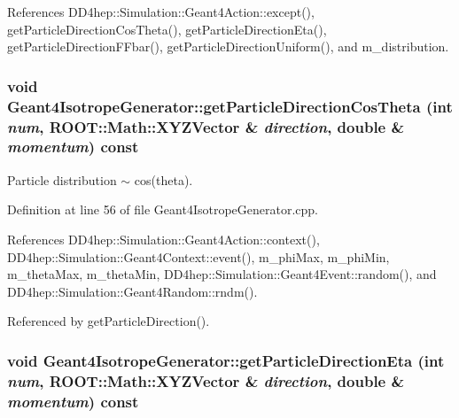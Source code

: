 References DD4hep::Simulation::Geant4Action::except(), getParticleDirectionCosTheta(), getParticleDirectionEta(), getParticleDirectionFFbar(), getParticleDirectionUniform(), and m\_\-distribution.\hypertarget{class_d_d4hep_1_1_simulation_1_1_geant4_isotrope_generator_a65335e157f828238e0e9f30fcd3dc0d8}{
\subsubsection[{getParticleDirectionCosTheta}]{\setlength{\rightskip}{0pt plus 5cm}void Geant4IsotropeGenerator::getParticleDirectionCosTheta (int {\em num}, \/  ROOT::Math::XYZVector \& {\em direction}, \/  double \& {\em momentum}) const}}
\label{class_d_d4hep_1_1_simulation_1_1_geant4_isotrope_generator_a65335e157f828238e0e9f30fcd3dc0d8}


Particle distribution $\sim$ cos(theta). 

Definition at line 56 of file Geant4IsotropeGenerator.cpp.

References DD4hep::Simulation::Geant4Action::context(), DD4hep::Simulation::Geant4Context::event(), m\_\-phiMax, m\_\-phiMin, m\_\-thetaMax, m\_\-thetaMin, DD4hep::Simulation::Geant4Event::random(), and DD4hep::Simulation::Geant4Random::rndm().

Referenced by getParticleDirection().\hypertarget{class_d_d4hep_1_1_simulation_1_1_geant4_isotrope_generator_aa93baab476bd121730d9a51a3fd02eac}{
\subsubsection[{getParticleDirectionEta}]{\setlength{\rightskip}{0pt plus 5cm}void Geant4IsotropeGenerator::getParticleDirectionEta (int {\em num}, \/  ROOT::Math::XYZVector \& {\em direction}, \/  double \& {\em momentum}) const}}
\label{class_d_d4hep_1_1_simulation_1_1_geant4_isotrope_generator_aa93baab476bd121730d9a51a3fd02eac}


